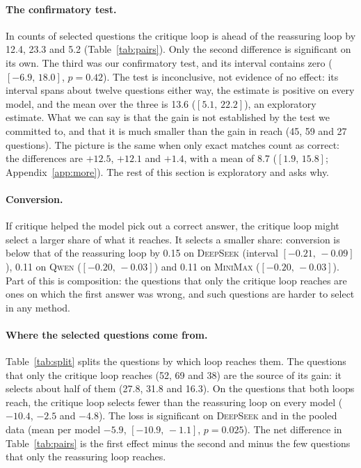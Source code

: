 \documentclass[11pt]{article}
\newcommand{\ds}{\textsc{DeepSeek}}
\newcommand{\qw}{\textsc{Qwen}}
\newcommand{\mm}{\textsc{MiniMax}}
\newcommand{\ci}[2]{$[#1,\,#2]$}
\begin{document}
\paragraph{The confirmatory test.}
In counts of selected questions the critique loop is ahead of the reassuring loop by 12.4, 23.3 and 5.2 (Table~\ref{tab:pairs}).
Only the second difference is significant on its own.
The third was our confirmatory test, and its interval contains zero (\ci{-6.9}{18.0}, $p=0.42$).
The test is inconclusive, not evidence of no effect: its interval spans about twelve questions either way, the estimate is positive on every model, and the mean over the three is 13.6 (\ci{5.1}{22.2}), an exploratory estimate.
What we can say is that the gain is not established by the test we committed to, and that it is much smaller than the gain in reach (45, 59 and 27 questions).
The picture is the same when only exact matches count as correct: the differences are $+12.5$, $+12.1$ and $+1.4$, with a mean of 8.7 (\ci{1.9}{15.8}; Appendix~\ref{app:more}).
The rest of this section is exploratory and asks why.

\paragraph{Conversion.}
If critique helped the model pick out a correct answer, the critique loop might select a larger share of what it reaches.
It selects a smaller share: conversion is below that of the reassuring loop by 0.15 on \ds{} (interval \ci{-0.21}{-0.09}), 0.11 on \qw{} (\ci{-0.20}{-0.03}) and 0.11 on \mm{} (\ci{-0.20}{-0.03}).
Part of this is composition: the questions that only the critique loop reaches are ones on which the first answer was wrong, and such questions are harder to select in any method.

\paragraph{Where the selected questions come from.}
Table~\ref{tab:split} splits the questions by which loop reaches them.
The questions that only the critique loop reaches (52, 69 and 38) are the source of its gain: it selects about half of them (27.8, 31.8 and 16.3).
On the questions that both loops reach, the critique loop selects fewer than the reassuring loop on every model ($-10.4$, $-2.5$ and $-4.8$).
The loss is significant on \ds{} and in the pooled data (mean per model $-5.9$, \ci{-10.9}{-1.1}, $p=0.025$).
The net difference in Table~\ref{tab:pairs} is the first effect minus the second and minus the few questions that only the reassuring loop reaches.
\end{document}
